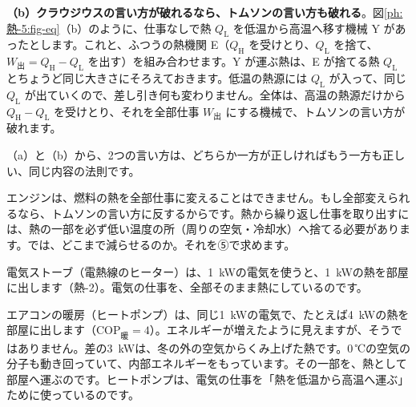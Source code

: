 \textbf{（b）クラウジウスの言い方が破れるなら、トムソンの言い方も破れる}。図\ref{ph:熱-5:fig-eq}（b）のように、仕事なしで熱 $Q_{\mathrm L}$ を低温から高温へ移す機械 Y があったとします。これと、ふつうの熱機関 E（$Q_{\mathrm H}$ を受けとり、$Q_{\mathrm L}$ を捨て、$W_{\text{出}}=Q_{\mathrm H}-Q_{\mathrm L}$ を出す）を組み合わせます。Y が運ぶ熱は、E が捨てる熱 $Q_{\mathrm L}$ とちょうど同じ大きさにそろえておきます。低温の熱源には $Q_{\mathrm L}$ が入って、同じ $Q_{\mathrm L}$ が出ていくので、差し引き何も変わりません。全体は、高温の熱源だけから $Q_{\mathrm H}-Q_{\mathrm L}$ を受けとり、それを全部仕事 $W_{\text{出}}$ にする機械で、トムソンの言い方が破れます。

（a）と（b）から、2つの言い方は、どちらか一方が正しければもう一方も正しい、同じ内容の法則です。

エンジンは、燃料の熱を全部仕事に変えることはできません。もし全部変えられるなら、トムソンの言い方に反するからです。熱から繰り返し仕事を取り出すには、熱の一部を必ず低い温度の所（周りの空気・冷却水）へ捨てる必要があります。では、どこまで減らせるのか。それを⑤で求めます。

\label{ph:熱-5:sec4}
電気ストーブ（電熱線のヒーター）は、\qty{1}{kW}の電気を使うと、\qty{1}{kW}の熱を部屋に出します（熱-2）。電気の仕事を、全部そのまま熱にしているのです。

エアコンの暖房（ヒートポンプ）は、同じ\qty{1}{kW}の電気で、たとえば\qty{4}{kW}の熱を部屋に出します（$\mathrm{COP}_{\text{暖}}=4$）。エネルギーが増えたように見えますが、そうではありません。差の\qty{3}{kW}は、冬の外の空気からくみ上げた熱です。0\,℃の空気の分子も動き回っていて、内部エネルギーをもっています。その一部を、熱として部屋へ運ぶのです。ヒートポンプは、電気の仕事を「熱を低温から高温へ運ぶ」ために使っているのです。

